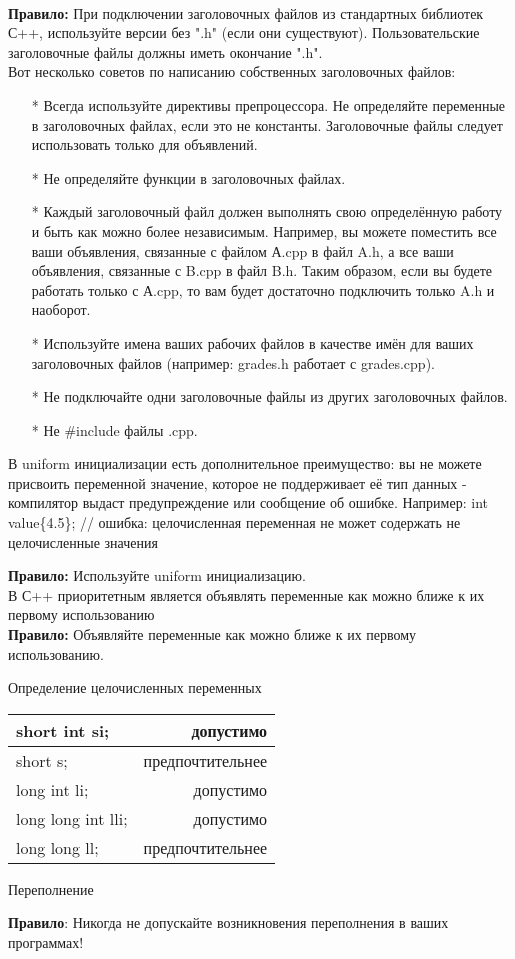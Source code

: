 \documentclass[a4paper,16pt]{report} %
\begin{document}
\\
\textbf{Правило:} При подключении заголовочных файлов из стандартных библиотек С++, используйте версии без ".h" (если они существуют). Пользовательские заголовочные файлы должны иметь окончание ".h".
\\
Вот несколько советов по написанию собственных заголовочных файлов:
\begin{itemize}
\item[*]Всегда используйте директивы препроцессора.
Не определяйте переменные в заголовочных файлах, если это не константы. Заголовочные файлы следует использовать только для объявлений.
\item[*]Не определяйте функции в заголовочных файлах.
\item[*]Каждый заголовочный файл должен выполнять свою определённую работу и быть как можно более независимым. Например, вы можете поместить все ваши объявления, связанные с файлом А.cpp в файл A.h, а все ваши объявления, связанные с B.cpp в файл B.h. Таким образом, если вы будете работать только с А.cpp, то вам будет достаточно подключить только A.h и наоборот.
\item[*]Используйте имена ваших рабочих файлов в качестве имён для ваших заголовочных файлов (например: grades.h работает с grades.cpp).
\item[*]Не подключайте одни заголовочные файлы из других заголовочных файлов.
\item[*]Не \#include  файлы .cpp.
\end{itemize}
\begin{sloppypar}В uniform инициализации есть дополнительное преимущество: вы не можете присвоить переменной значение, которое не поддерживает её тип данных - компилятор выдаст предупреждение или сообщение об
ошибке. Например:
int value\{4.5\}; // ошибка: целочисленная переменная не может содержать не целочисленные значения
\end{sloppypar}

\textbf{Правило:} Используйте uniform инициализацию.
\\
В С++ приоритетным является объявлять переменные как можно ближе к их первому использованию
\\
\textbf{Правило:} Объявляйте переменные как можно ближе к их первому использованию.
\\
\begin{center}
Определение целочисленных переменных
\end{center}
\begin{center}
	\begin{tabular}{ | l | r |}
		\hline
		short int si; & допустимо \\ \hline
		short s; & предпочтительнее \\ \hline
		long int li; & допустимо \\ \hline
		long long int lli; & допустимо \\ \hline
		long long ll; & предпочтительнее \\
		\hline
	\end{tabular}
\end{center}
\begin{center}
Переполнение
\end{center}
\textbf{Правило}: Никогда не допускайте возникновения переполнения в ваших программах!
\end{document}
